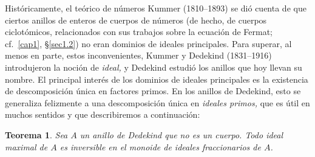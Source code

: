 \documentclass[oneside,bibtotoc,leqno,spanish]{amsbook}
\numberwithin{equation}{section}
\theoremstyle{defi}
\theoremstyle{note}
\newtheorem{theorem}{Teorema}
\theoremstyle{rem}
\numberwithin{theorem}{section}
\numberwithin{proposition}{section}
\numberwithin{definition}{section}
\numberwithin{lemma}{section}
\numberwithin{corollary}{section}
\numberwithin{example}{section}
\numberwithin{footnote}{section}%
\begin{document}
Hist\'oricamente, el te\'orico de n\'umeros Kummer (1810--1893) se di\'o cuenta de que
ciertos anillos de enteros de cuerpos de n\'umeros (de hecho, de cuerpos ciclot\'omicos, relacionados
con sus trabajos sobre la ecuaci\'on de Fermat; cf.~\ref{cap1}, \S\ref{sec1.2}) no eran dominios de ideales principales. Para
superar, al menos en parte, estos inconvenientes, Kummer y Dedekind (1831--1916) introdujeron la noci\'on
de {\em ideal,} y Dedekind estudi\'o los anillos que hoy llevan su nombre. El principal inter\'es de los dominios
de ideales principales es la existencia de descomposici\'on \'unica en factores primos. En los anillos de
Dedekind, esto se generaliza felizmente a una descomposici\'on \'unica en {\em ideales primos,} que es \'util
en muchos sentidos y que describiremos a continuaci\'on:

\begin{theorem}\label{teo3.4.2}
Sea $A$ un anillo de Dedekind que no es un cuerpo. Todo ideal maximal de $A$ es inversible en el monoide de
ideales fraccionarios de $A$.
\end{theorem}
\end{document}
